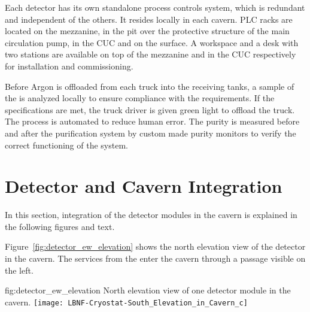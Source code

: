 Each detector has its own standalone process controls system, which is
redundant and independent of the others. It resides locally in each
cavern.  PLC racks are located on the mezzanine, in the pit over the
protective structure of the main  circulation pump, in the CUC and
on the surface. A workspace and a desk with two stations are available
on top of the mezzanine and in the CUC respectively for installation
and commissioning.

Before Argon is offloaded from each truck into the receiving tanks, a
sample of the  is analyzed locally to ensure compliance with the
requirements. If the specifications are met, the truck driver is given
green light to offload the truck. The process is automated to reduce
human error. The purity is measured before and after the purification
system by custom made purity monitors to verify the correct
functioning of the system.


\section{Detector and Cavern Integration}
\label{sec:fdsp-coord-det-cav-integ}
In this section, integration of the detector modules in the cavern is
explained in the following figures and text.

Figure~\ref{fig:detector_ew_elevation} shows the north
elevation view of the detector in the cavern. The services from the
 enter the cavern through a passage visible on the left.
\begin{dunefigure}{fig:detector_ew_elevation}
  {North elevation view of one detector module in the cavern.}
  \texttt{[image: LBNF-Cryostat-South\_Elevation\_in\_Cavern\_c]}
\end{dunefigure}

